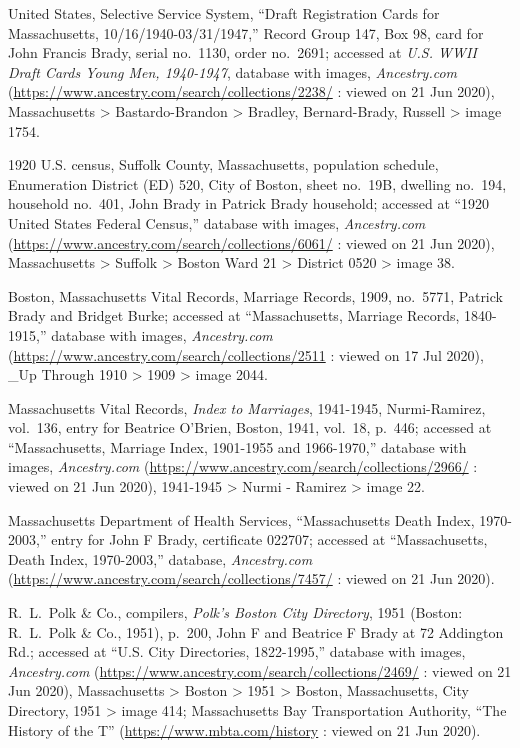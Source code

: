 \begin{thebibliography}{999}
United States, Selective Service System, ``Draft Registration Cards for Massachusetts, 10/16/1940-03/31/1947,'' Record Group 147, Box 98, card for John Francis Brady, serial no.\ 1130, order no.\ 2691; accessed at \textit{U.S. WWII Draft Cards Young Men, 1940-1947}, database with images, \textit{Ancestry.com} (\url{https://www.ancestry.com/search/collections/2238/} : viewed on 21 Jun 2020), Massachusetts >  Bastardo-Brandon > Bradley, Bernard-Brady, Russell > image 1754.

1920 U.S. census, Suffolk County, Massachusetts, population schedule, Enumeration District (ED) 520, City of Boston, sheet no.\ 19B, dwelling no.\ 194, household no.\ 401, John Brady in Patrick Brady household; accessed at ``1920 United States Federal Census,'' database with images, \textit{Ancestry.com} (\url{https://www.ancestry.com/search/collections/6061/} : viewed on 21 Jun 2020), Massachusetts > Suffolk > Boston Ward 21 > District 0520 > image 38.

Boston, Massachusetts Vital Records, Marriage Records, 1909, no.\ 5771, Patrick Brady and Bridget Burke; accessed at ``Massachusetts, Marriage Records, 1840-1915,'' database with images, \textit{Ancestry.com} (\url{https://www.ancestry.com/search/collections/2511} : viewed on 17 Jul 2020), \_Up Through 1910 > 1909 > image 2044.

Massachusetts Vital Records, \textit{Index to Marriages}, 1941-1945, Nurmi-Ramirez, vol.\ 136, entry for Beatrice O'Brien, Boston, 1941, vol.\ 18, p.\ 446; accessed at ``Massachusetts, Marriage Index, 1901-1955 and 1966-1970,'' database with images, \textit{Ancestry.com} (\url{https://www.ancestry.com/search/collections/2966/} : viewed on 21 Jun 2020), 1941-1945 > Nurmi - Ramirez > image 22.

Massachusetts Department of Health Services, ``Massachusetts Death Index, 1970-2003,'' entry for John F Brady, certificate 022707; accessed at ``Massachusetts, Death Index, 1970-2003,'' database, \textit{Ancestry.com} (\url{https://www.ancestry.com/search/collections/7457/} : viewed on 21 Jun 2020).

R.\ L.\ Polk \& Co., compilers, \textit{Polk's Boston City Directory}, 1951 (Boston: R.\ L.\ Polk \& Co., 1951), p.\ 200, John F and Beatrice F Brady at 72 Addington Rd.; accessed at ``U.S. City Directories, 1822-1995,'' database with images, \textit{Ancestry.com} (\url{https://www.ancestry.com/search/collections/2469/} : viewed on 21 Jun 2020), Massachusetts > Boston > 1951 > Boston, Massachusetts, City Directory, 1951 > image 414; Massachusetts Bay Transportation Authority, ``The History of the T'' (\url{https://www.mbta.com/history} : viewed on 21 Jun 2020).


\end{thebibliography}
